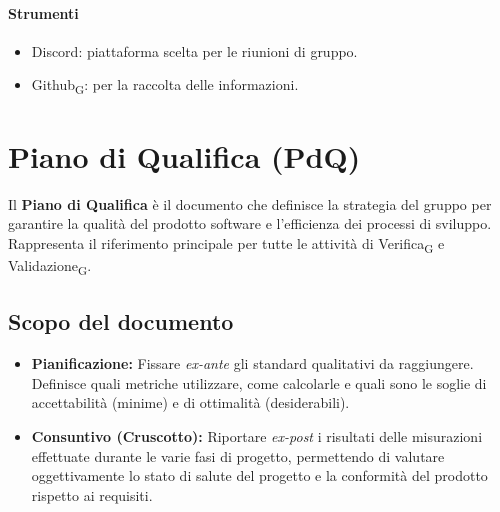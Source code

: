 \documentclass[11pt,a4paper]{article}
\newcommand{\gls}[1]{#1\textsubscript{G}}
\begin{document}
\paragraph{Strumenti}
\begin{itemize}
\item Discord: piattaforma scelta per le riunioni di gruppo.
\item \gls{Github}: per la raccolta delle informazioni.
\end{itemize}

\newpage

\section{Piano di Qualifica (PdQ)}
Il \textbf{Piano di Qualifica} è il documento che definisce la strategia del gruppo per garantire la qualità del prodotto software e l'efficienza dei processi di sviluppo. Rappresenta il riferimento principale per tutte le attività di \gls{Verifica} e \gls{Validazione}.

\subsection{Scopo del documento}
\begin{itemize}
    \item \textbf{Pianificazione:} Fissare \textit{ex-ante} gli standard qualitativi da raggiungere. Definisce quali metriche utilizzare, come calcolarle e quali sono le soglie di accettabilità (minime) e di ottimalità (desiderabili).
    \item \textbf{Consuntivo (Cruscotto):} Riportare \textit{ex-post} i risultati delle misurazioni effettuate durante le varie fasi di progetto, permettendo di valutare oggettivamente lo stato di salute del progetto e la conformità del prodotto rispetto ai requisiti.
\end{itemize}
\end{document}
